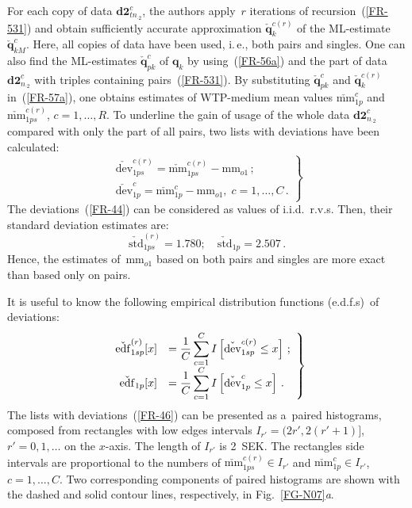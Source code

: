 \begin{multicols}{2}
For each copy of data $\mathbf{d2}_{t n_{\cdot 2}}^c$, the authors apply~$r$
iterations of recursion~(\ref{FR-531}) and obtain sufficiently
accurate approximation $\check{\mathbf{q}}_k^{c(r)}$ of the ML-estimate
$\check{\mathbf{q}}_{kM}^{ c}.$ Here, all copies of data have been used, i.\,e.,
both pairs and singles. One can also find the ML-estimates
$\check{\mathbf{q}}_{pk}^c$ of $\mathbf{q}_{k}$ by using~(\ref{FR-56a})
and the part of data $\mathbf{d2}_{n_{\cdot 2}}^c$ with triples
containing pairs~(\ref{FR-531}).
 By substituting $\check{\mathbf{q}}_{pk}^c$
and $\check{\mathbf{q}}_k^{c(r)}$ in~(\ref{FR-57a}), one obtains estimates
of WTP-medium mean values $\check{\mathrm{mm}}_{1p}^c$ and
$\check{\mathrm{mm}}_{1ps}^{c(r)}$, $c=1, \ldots, R.$ To underline the gain of usage
of the whole data $\mathbf{d2}_{n_{\cdot 2}}^c$ compared with only the
part of all pairs,  two lists with  deviations have been calculated:
\begin{equation}
\left.
\begin{array}{c}
    \check{\mathrm{dev}}_{1ps}^{c(r)}= \check{\mathrm{mm}}_{1ps}^{c(r)} - \mathrm{mm}_{o 1}\,;\\[6pt]
     \check{\mathrm{dev}}_{1p}^c= \check{\mathrm{mm}}_{1p}^c - \mathrm{mm}_{o1},\;
    c=1, \ldots, C\,.
    \end{array}
    \right\}
    \label{FR-44}
\end{equation}
The deviations~(\ref{FR-44})   can be considered
as  values  of i.i.d.\ r.v.s. Then, their standard deviation
estimates are:
$$
\check{\mathrm{std}}_{1 ps}^{(r)} =1.780; \quad
\check{\mathrm{std}}_{1p} =2.507\,. 
$$
 Hence, the estimates of~mm$_{o1}$ based on both pairs and singles are more exact
 than based only on pairs.

 It is useful to know the following empirical distribution
 functions  (e.d.f.s)\ of deviations:
\begin{equation}
\left.
\begin{array}{rl}
 \check{\mathrm{edf}}_{1sp}^{(r)}[x] &=\displaystyle\frac{\displaystyle 1\mathstrut}{\displaystyle C\mathstrut} \sum\limits_{c=1}^C
I\left[\check{\mathrm{dev}}_{1 sp}^{c(r)}\le x\right]\,;\\[6pt]
  \check{\mathrm{edf}}_{1p}[x] &=\displaystyle\frac{\displaystyle 1\mathstrut}{\displaystyle C\mathstrut} \sum\limits_{c=1}^C
I\left[\check{\mathrm{dev}}_{1p}^c\le x\right]\,.
\end{array}
\right\}
\label{FR-46}
\end{equation}
The lists with deviations~(\ref{FR-46}) can be presented as a~paired histograms,
composed from rectangles with low edges intervals $I_{r'} =(2r', 2(r'+1)]$, 
$r'=0, 1,\ldots$ on the $x$-axis. The length of $I_{r'}$ is 
2~SEK. The rectangles side intervals are proportional to the
numbers of $\check{\mathrm{mm}}_{1ps}^{c(r)}\in I_{r'}$ and $\check{\mathrm{mm}}_{1p}^c\in
I_{r'}$, $c=1, \ldots, C.$ Two corresponding components of paired histograms are
shown with the
dashed and solid contour lines, respectively, in Fig.~\ref{FG-N07}\textit{a}.


\end{multicols}
